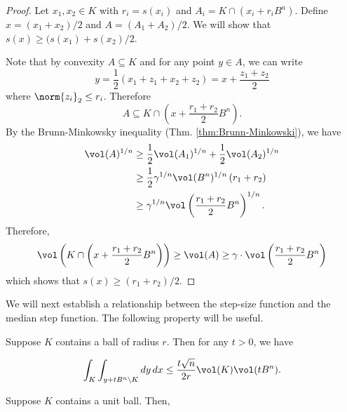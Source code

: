 \begin{proof}
Let $x_{1},x_{2}\in K$ with $r_{i}=s(x_{i})$ and $A_{i}=K\cap(x_{i}+r_{i}B^{n})$.
Define $x=(x_{1}+x_{2})/2$ and $A=(A_{1}+A_{2})/2$. We will show
that $s(x)\ge(s(x_{1})+s(x_{2})/2$. 

Note that by convexity $A\subseteq K$ and for any point $y\in A$,
we can write 
\[
y=\frac{1}{2}(x_{1}+z_{1}+x_{2}+z_{2})=x+\frac{z_{1}+z_{2}}{2}
\]
where $\norm{z_{i}}_{2}\le r_{i}$. Therefore 
\[
A\subseteq K\cap\left(x+\frac{r_{1}+r_{2}}{2}B^{n}\right).
\]
By the Brunn-Minkowsky inequality (Thm. \ref{thm:Brunn-Minkowski}),
we have 
\begin{align*}
\vol(A)^{1/n} & \ge\frac{1}{2}\vol(A_{1})^{1/n}+\frac{1}{2}\vol(A_{2})^{1/n}\\
 & \ge\frac{1}{2}\gamma^{1/n}\vol(B^{n})^{1/n}\left(r_{1}+r_{2}\right)\\
 & \ge\gamma^{1/n}\vol\left(\frac{r_{1}+r_{2}}{2}B^{n}\right)^{1/n}.
\end{align*}
Therefore, 
\[
\vol\left(K\cap\left(x+\frac{r_{1}+r_{2}}{2}B^{n}\right)\right)\ge\vol(A)\ge\gamma\cdot\vol\left(\frac{r_{1}+r_{2}}{2}B^{n}\right)
\]
which shows that $s(x)\ge(r_{1}+r_{2})/2$. 
\end{proof}
We will next establish a relationship between the step-size function
and the median step function. The following property \cite[Corollary 4.6]{kannan1997random}
will be useful.
\begin{lem}
\label{lem:step_out_prob}Suppose $K$ contains a ball of radius $r$.
Then for any $t>0$, we have
\end{lem}

\[
\int_{K}\int_{y+tB^{n}\setminus K}dy\,dx\le\frac{t\sqrt{n}}{2r}\vol(K)\vol(tB^{n}).
\]

\begin{lem}
\label{lem:step-size} Suppose $K$ contains a unit ball. Then, 
\end{lem}

